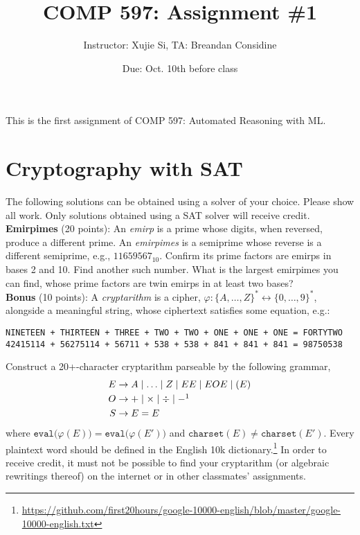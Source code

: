 \documentclass[11pt]{article}
\author{Instructor: Xujie Si, TA: Breandan Considine}
\date{Due: Oct. 10th before class}
\title{COMP 597: Assignment \#1}
\begin{document}
    \maketitle
    \noindent This is the first assignment of COMP 597: Automated Reasoning with ML.

    \section{Cryptography with SAT}

    The following solutions can be obtained using a solver of your choice. Please show all work. Only solutions obtained using a SAT solver will receive credit.\\

    \noindent \textbf{Emirpimes} (20 points): An \textit{emirp} is a prime whose digits, when reversed, produce a different prime. An \textit{emirpimes} is a semiprime whose reverse is a different semiprime, e.g., $11659567_{10}$. Confirm its prime factors are emirps in bases 2 and 10. Find another such number. What is the largest emirpimes you can find, whose prime factors are twin emirps in at least two bases?\\

    \noindent \textbf{Bonus} (10 points): A \textit{cryptarithm} is a cipher, $\varphi: \{A,\ldots, Z\}^*\leftrightarrow \{0, \ldots, 9\}^*$, alongside a meaningful string, whose ciphertext satisfies some equation, e.g.:

    \begin{lstlisting}[basicstyle=\scriptsize\ttfamily]
NINETEEN + THIRTEEN + THREE + TWO + TWO + ONE + ONE + ONE = FORTYTWO
42415114 + 56275114 + 56711 + 538 + 538 + 841 + 841 + 841 = 98750538
    \end{lstlisting}

    \noindent Construct a 20+-character cryptarithm parseable by the following grammar,
    \begin{align*}
E &\rightarrow A \mid \ldots \mid Z \mid EE \mid E O E \mid ( E )\\
O &\rightarrow + \mid \times \mid \div \mid -\footnotemark\\
S &\rightarrow E = E
    \end{align*}
    \noindent where $\texttt{eval}\big(\varphi(E)\big) = \texttt{eval}\big(\varphi(E')\big)$ and $\texttt{charset}(E) \neq \texttt{charset}(E')$. Every plaintext word should be defined in the English 10k dictionary.\footnote{\tiny\url{https://github.com/first20hours/google-10000-english/blob/master/google-10000-english.txt}} In order to receive credit, it must not be possible to find your cryptarithm (or algebraic rewritings thereof) on the internet or in other classmates' assignments.\\
\end{document}
